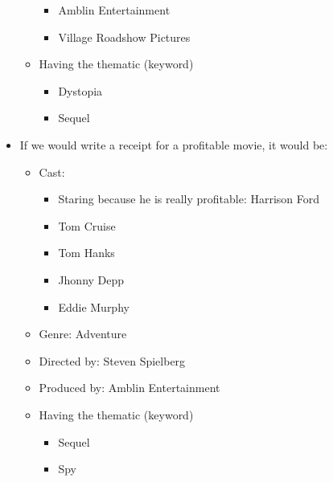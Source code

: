 \documentclass[11pt]{article}
\providecommand{\tightlist}{%
      \setlength{\itemsep}{0pt}\setlength{\parskip}{0pt}}
\begin{document}
\begin{itemize}
\begin{itemize}
    \begin{itemize}
    \tightlist
    \item
      Amblin Entertainment
    \item
      Village Roadshow Pictures
    \end{itemize}
  \item
    Having the thematic (keyword)

    \begin{itemize}
    \tightlist
    \item
      Dystopia
    \item
      Sequel
    \end{itemize}
  \end{itemize}
\item
  If we would write a receipt for a profitable movie, it would be:

  \begin{itemize}
  \tightlist
  \item
    Cast:

    \begin{itemize}
    \tightlist
    \item
      Staring because he is really profitable: Harrison Ford
    \item
      Tom Cruise
    \item
      Tom Hanks
    \item
      Jhonny Depp
    \item
      Eddie Murphy
    \end{itemize}
  \item
    Genre: Adventure
  \item
    Directed by: Steven Spielberg
  \item
    Produced by: Amblin Entertainment
  \item
    Having the thematic (keyword)

    \begin{itemize}
    \tightlist
    \item
      Sequel
    \item
      Spy
    \end{itemize}
  \end{itemize}
\end{itemize}


    
    
    
    
\end{document}
